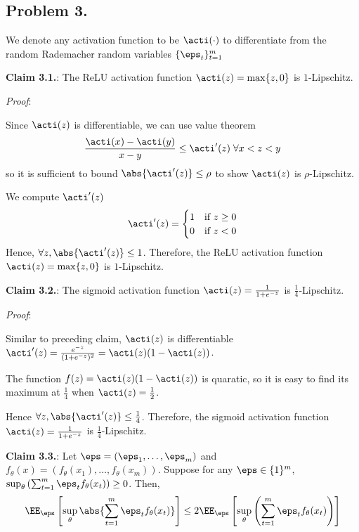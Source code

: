 
\newpage
\subsection*{Problem 3.}

We denote any activation function to be $\acti(\cdot)$ to differentiate from the random Rademacher random variables $\{\eps_t\}_{t=1}^m$

\textbf{Claim 3.1.}: The ReLU activation function $\acti(z) = \max\{z,0\}$ is $1$-Lipschitz.

\textit{Proof}:

Since $\acti(z)$ is differentiable, we can use value theorem
\begin{align*}
  \frac{\acti(x) - \acti(y)}{x-y} \le \acti'(z) \; \forall x < z < y
\end{align*}
so it is sufficient to bound $\abs{\acti'(z)} \le \rho$ to show $\acti(z)$ is $\rho$-Lipschitz.

We compute $\acti'(z)$
\begin{align*}
  \acti'(z) =
  \begin{cases} 
    1 & \text{if } z \ge 0 \\
    0 & \text{if } z < 0
  \end{cases}
\end{align*}
Hence, $\forall z, \abs{\acti'(z)} \le 1$. Therefore, the ReLU activation function $\acti(z) = \max\{z,0\}$ is $1$-Lipschitz.

\textbf{Claim 3.2.}: The sigmoid activation function $\acti(z) = \frac{1}{1+e^{-z}}$ is $\frac{1}{4}$-Lipschitz.

\textit{Proof}:

Similar to preceding claim, $\acti(z)$ is differentiable $\acti'(z) = \frac{e^{-z}}{(1 + e^{-z})^2} = \acti(z)(1-\acti(z))$.

The function $f(z) = \acti(z)(1-\acti(z))$ is quaratic, so it is easy to find its maximum at $\frac{1}{4}$ when $\acti(z) = \frac{1}{2}$.

Hence $\forall z, \abs{\acti'(z)} \le \frac{1}{4}$. Therefore, the sigmoid activation function $\acti(z) = \frac{1}{1+e^{-z}}$ is $\frac{1}{4}$-Lipschitz.

\textbf{Claim 3.3.}: Let $\eps = (\eps_1,\ldots,\eps_m)$ and $f_{\theta}(x) = (f_{\theta}(x_1),\ldots,f_{\theta}(x_m))$. Suppose for any $\eps \in \{ 1\}^m$, $\sup_{\theta} \left( \sum_{t=1}^m \eps_tf_{\theta}(x_t) \right) \ge 0$. Then,
\begin{align*}
  \EE_{\eps} \left[ \sup_{\theta}\abs{\sum_{t=1}^m \eps_tf_{\theta}(x_t)} \right] \le 2\EE_{\eps} \left[ \sup_{\theta} \left( \sum_{t=1}^m \eps_tf_{\theta}(x_t) \right) \right] 
\end{align*}

